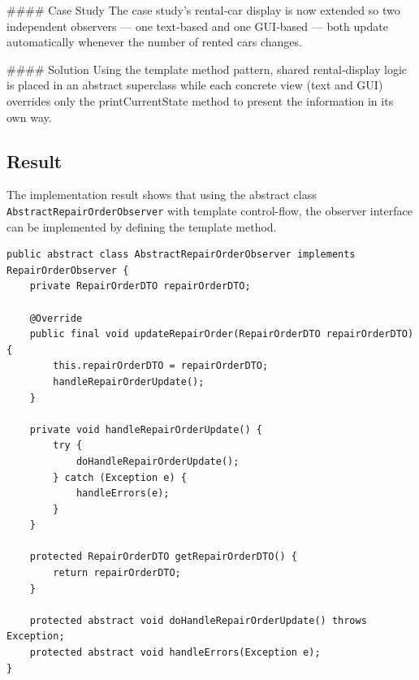 \documentclass[a4paper]{scrartcl}
\begin{document}
#### Case Study
The case study’s rental‑car display is now extended so two independent observers — one text‑based and one GUI‑based — both update automatically whenever the number of rented cars changes.

#### Solution
Using the template method pattern, shared rental‑display logic is placed in an abstract superclass while each concrete view (text and GUI) overrides only the printCurrentState method to present the information in its own way.
\fi

\subsection{Result}


The implementation result shows that using the abstract class \texttt{AbstractRepairOrderObserver} with template control-flow, the observer interface can be implemented by defining the template method.

\begin{lstlisting}[style=javastyle, caption={View.proceedActions catching exceptions and displaying error messages}]
public abstract class AbstractRepairOrderObserver implements RepairOrderObserver {
    private RepairOrderDTO repairOrderDTO;

    @Override
    public final void updateRepairOrder(RepairOrderDTO repairOrderDTO) {
        this.repairOrderDTO = repairOrderDTO;
        handleRepairOrderUpdate();
    }

    private void handleRepairOrderUpdate() {
        try {
            doHandleRepairOrderUpdate();
        } catch (Exception e) {
            handleErrors(e);
        }
    }

    protected RepairOrderDTO getRepairOrderDTO() {
        return repairOrderDTO;
    }

    protected abstract void doHandleRepairOrderUpdate() throws Exception;
    protected abstract void handleErrors(Exception e);
}
\end{lstlisting}
\end{document}
